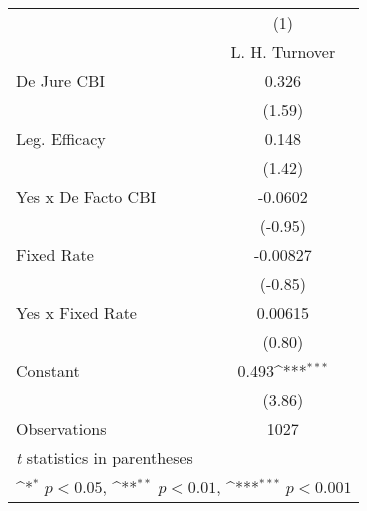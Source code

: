 \begin{table}[htbp]\centering
\def\sym#1{\ifmmode^{#1}\else\(^{#1}\)\fi}
\caption{\label{llpFEDJ}}
\begin{tabular}{l*{1}{c}}
\toprule
                                        &\multicolumn{1}{c}{(1)}\\
                                        &\multicolumn{1}{c}{L. H. Turnover}\\
\midrule
De Jure CBI                             &    0.326         \\
                                        &   (1.59)         \\
\addlinespace
Leg. Efficacy                           &    0.148         \\
                                        &   (1.42)         \\
\addlinespace
Yes x De Facto CBI                      &  -0.0602         \\
                                        &  (-0.95)         \\
\addlinespace
Fixed Rate                              & -0.00827         \\
                                        &  (-0.85)         \\
\addlinespace
Yes x Fixed Rate                        &  0.00615         \\
                                        &   (0.80)         \\
\addlinespace
Constant                                &    0.493\sym{***}\\
                                        &   (3.86)         \\
\midrule
Observations                            &     1027         \\
\bottomrule
\multicolumn{2}{l}{\footnotesize \textit{t} statistics in parentheses}\\
\multicolumn{2}{l}{\footnotesize \sym{*} \(p<0.05\), \sym{**} \(p<0.01\), \sym{***} \(p<0.001\)}\\
\end{tabular}
\end{table}
